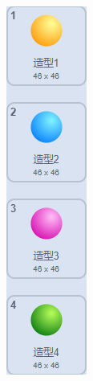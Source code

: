 \documentclass[10pt, a4paper]{article}
\begin{document}
\begin{enumerate}
\begin{figure}[htbp]
\begin{minipage}[t]{.24\textwidth}
\begin{minipage}[t]{.45\textwidth}
                    \includegraphics[width=.45\textwidth]{11-1.png}
                \end{minipage}
                \begin{minipage}[t]{.48\textwidth}

\end{minipage}
\end{minipage}
\end{figure}
\end{enumerate}
\end{document}
